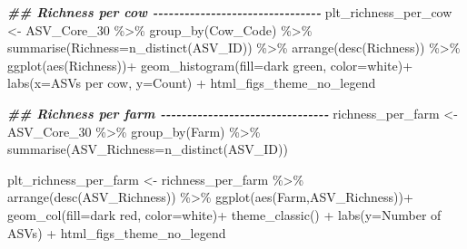 \documentclass[
]{article}
\newenvironment{Shaded}{\begin{snugshade}}{\end{snugshade}}
\newcommand{\AttributeTok}[1]{\textcolor[rgb]{0.77,0.63,0.00}{#1}}
\newcommand{\DocumentationTok}[1]{\textcolor[rgb]{0.56,0.35,0.01}{\textbf{\textit{#1}}}}
\newcommand{\FunctionTok}[1]{\textcolor[rgb]{0.00,0.00,0.00}{#1}}
\newcommand{\NormalTok}[1]{#1}
\newcommand{\OtherTok}[1]{\textcolor[rgb]{0.56,0.35,0.01}{#1}}
\newcommand{\SpecialCharTok}[1]{\textcolor[rgb]{0.00,0.00,0.00}{#1}}
\newcommand{\StringTok}[1]{\textcolor[rgb]{0.31,0.60,0.02}{#1}}
\begin{document}
\begin{Shaded}
\begin{Highlighting}[]
\DocumentationTok{\#\# Richness per cow  {-}{-}{-}{-}{-}{-}{-}{-}{-}{-}{-}{-}{-}{-}{-}{-}{-}{-}{-}{-}{-}{-}{-}{-}{-}{-}{-}{-}{-}{-}{-}{-}}
\NormalTok{plt\_richness\_per\_cow }\OtherTok{\textless{}{-}} 
\NormalTok{ASV\_Core\_30 }\SpecialCharTok{\%\textgreater{}\%}
  \FunctionTok{group\_by}\NormalTok{(Cow\_Code) }\SpecialCharTok{\%\textgreater{}\%}
  \FunctionTok{summarise}\NormalTok{(}\AttributeTok{Richness=}\FunctionTok{n\_distinct}\NormalTok{(ASV\_ID)) }\SpecialCharTok{\%\textgreater{}\%}
  \FunctionTok{arrange}\NormalTok{(}\FunctionTok{desc}\NormalTok{(Richness)) }\SpecialCharTok{\%\textgreater{}\%} 
  \FunctionTok{ggplot}\NormalTok{(}\FunctionTok{aes}\NormalTok{(Richness))}\SpecialCharTok{+}
  \FunctionTok{geom\_histogram}\NormalTok{(}\AttributeTok{fill=}\StringTok{\textquotesingle{}dark green\textquotesingle{}}\NormalTok{, }\AttributeTok{color=}\StringTok{\textquotesingle{}white\textquotesingle{}}\NormalTok{)}\SpecialCharTok{+}
  \FunctionTok{labs}\NormalTok{(}\AttributeTok{x=}\StringTok{\textquotesingle{}ASVs per cow\textquotesingle{}}\NormalTok{, }\AttributeTok{y=}\StringTok{\textquotesingle{}Count\textquotesingle{}}\NormalTok{) }\SpecialCharTok{+}
\NormalTok{  html\_figs\_theme\_no\_legend}

\DocumentationTok{\#\# Richness per farm  {-}{-}{-}{-}{-}{-}{-}{-}{-}{-}{-}{-}{-}{-}{-}{-}{-}{-}{-}{-}{-}{-}{-}{-}{-}{-}{-}{-}{-}{-}{-}{-}}
\NormalTok{richness\_per\_farm }\OtherTok{\textless{}{-}}\NormalTok{ ASV\_Core\_30 }\SpecialCharTok{\%\textgreater{}\%}
  \FunctionTok{group\_by}\NormalTok{(Farm) }\SpecialCharTok{\%\textgreater{}\%}
  \FunctionTok{summarise}\NormalTok{(}\AttributeTok{ASV\_Richness=}\FunctionTok{n\_distinct}\NormalTok{(ASV\_ID)) }

\NormalTok{plt\_richness\_per\_farm }\OtherTok{\textless{}{-}} 
\NormalTok{  richness\_per\_farm }\SpecialCharTok{\%\textgreater{}\%}
  \FunctionTok{arrange}\NormalTok{(}\FunctionTok{desc}\NormalTok{(ASV\_Richness)) }\SpecialCharTok{\%\textgreater{}\%} 
  \FunctionTok{ggplot}\NormalTok{(}\FunctionTok{aes}\NormalTok{(Farm,ASV\_Richness))}\SpecialCharTok{+}
  \FunctionTok{geom\_col}\NormalTok{(}\AttributeTok{fill=}\StringTok{\textquotesingle{}dark red\textquotesingle{}}\NormalTok{, }\AttributeTok{color=}\StringTok{\textquotesingle{}white\textquotesingle{}}\NormalTok{)}\SpecialCharTok{+}
  \FunctionTok{theme\_classic}\NormalTok{() }\SpecialCharTok{+}
  \FunctionTok{labs}\NormalTok{(}\AttributeTok{y=}\StringTok{\textquotesingle{}Number of ASVs\textquotesingle{}}\NormalTok{) }\SpecialCharTok{+}
\NormalTok{  html\_figs\_theme\_no\_legend}




\end{Highlighting}
\end{Shaded}
\end{document}
